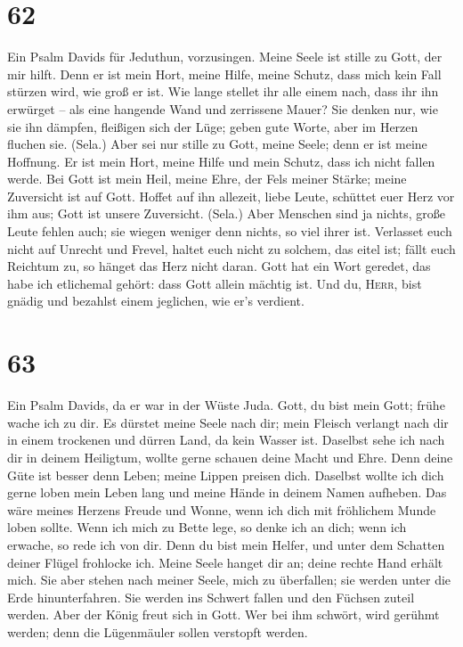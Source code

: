 \hypertarget{section-61}{%
\section{62}\label{section-61}}

 Ein Psalm Davids für Jeduthun, vorzusingen.
 Meine Seele ist stille zu Gott, der mir hilft.
 Denn er ist mein Hort, meine Hilfe, meine Schutz, dass
mich kein Fall stürzen wird, wie groß er ist.  Wie lange
stellet ihr alle einem nach, dass ihr ihn erwürget -- als eine hangende
Wand und zerrissene Mauer?  Sie denken nur, wie sie ihn
dämpfen, fleißigen sich der Lüge; geben gute Worte, aber im Herzen
fluchen sie. (Sela.)  Aber sei nur stille zu Gott, meine
Seele; denn er ist meine Hoffnung.  Er ist mein Hort,
meine Hilfe und mein Schutz, dass ich nicht fallen werde. 
Bei Gott ist mein Heil, meine Ehre, der Fels meiner Stärke; meine
Zuversicht ist auf Gott.  Hoffet auf ihn allezeit, liebe
Leute, schüttet euer Herz vor ihm aus; Gott ist unsere Zuversicht.
(Sela.)  Aber Menschen sind ja nichts, große Leute fehlen
auch; sie wiegen weniger denn nichts, so viel ihrer ist. 
Verlasset euch nicht auf Unrecht und Frevel, haltet euch nicht zu
solchem, das eitel ist; fällt euch Reichtum zu, so hänget das Herz nicht
daran.  Gott hat ein Wort geredet, das habe ich
etlichemal gehört: dass Gott allein mächtig ist.  Und du,
\textsc{Herr}, bist gnädig und bezahlst einem jeglichen, wie er's
verdient.

\hypertarget{section-62}{%
\section{63}\label{section-62}}

 Ein Psalm Davids, da er war in der Wüste Juda.
 Gott, du bist mein Gott; frühe wache ich zu dir. Es
dürstet meine Seele nach dir; mein Fleisch verlangt nach dir in einem
trockenen und dürren Land, da kein Wasser ist.  Daselbst
sehe ich nach dir in deinem Heiligtum, wollte gerne schauen deine Macht
und Ehre.  Denn deine Güte ist besser denn Leben; meine
Lippen preisen dich.  Daselbst wollte ich dich gerne loben
mein Leben lang und meine Hände in deinem Namen aufheben. 
Das wäre meines Herzens Freude und Wonne, wenn ich dich mit fröhlichem
Munde loben sollte.  Wenn ich mich zu Bette lege, so denke
ich an dich; wenn ich erwache, so rede ich von dir.  Denn
du bist mein Helfer, und unter dem Schatten deiner Flügel frohlocke ich.
 Meine Seele hanget dir an; deine rechte Hand erhält mich.
 Sie aber stehen nach meiner Seele, mich zu überfallen;
sie werden unter die Erde hinunterfahren.  Sie werden ins
Schwert fallen und den Füchsen zuteil werden.  Aber der
König freut sich in Gott. Wer bei ihm schwört, wird gerühmt werden; denn
die Lügenmäuler sollen verstopft werden.


